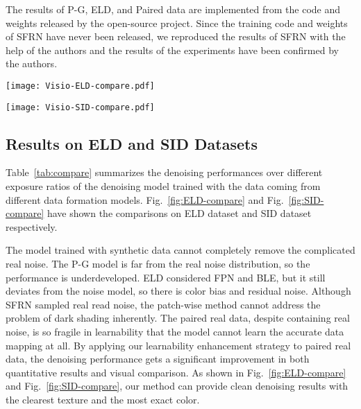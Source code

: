 \documentclass[sigconf,screen,nonacm]{acmart}
\begin{document}
    The results of P-G, ELD, and Paired data are implemented from the code and weights released by the open-source project. Since the training code and weights of SFRN have never been released, we reproduced the results of SFRN with the help of the authors and the results of the experiments have been confirmed by the authors.


    \begin{figure*}[t!]
        \texttt{[image: Visio-ELD-compare.pdf]}
        \caption{Raw image denoising results on images from the ELD dataset. (Best viewed with zoom)}
        \label{fig:ELD-compare}
    \end{figure*}
    \begin{figure*}[t!]
        \texttt{[image: Visio-SID-compare.pdf]}
        \caption{Raw image denoising results on images from the SID dataset. (Best viewed with zoom)}
        \label{fig:SID-compare}
    \end{figure*}
    


  \subsection{Results on ELD and SID Datasets}
Table~\ref{tab:compare} summarizes the denoising performances over different exposure ratios of the denoising model trained with the data coming from different data formation models. Fig.~\ref{fig:ELD-compare} and Fig.~\ref{fig:SID-compare} have shown the comparisons on ELD dataset and SID dataset respectively.

The model trained with synthetic data cannot completely remove the complicated real noise. The P-G model is far from the real noise distribution, so the performance is underdeveloped. ELD considered FPN and BLE, but it still deviates from the noise model, so there is color bias and residual noise. Although SFRN sampled real read noise, the patch-wise method cannot address the problem of dark shading inherently. The paired real data, despite containing real noise, is so fragile in learnability that the model cannot learn the accurate data mapping at all. By applying our learnability enhancement strategy to paired real data, the denoising performance gets a significant improvement in both quantitative results and visual comparison. As shown in Fig.~\ref{fig:ELD-compare} and Fig.~\ref{fig:SID-compare}, our method can provide clean denoising results with the clearest texture and the most exact color.
\end{document}
